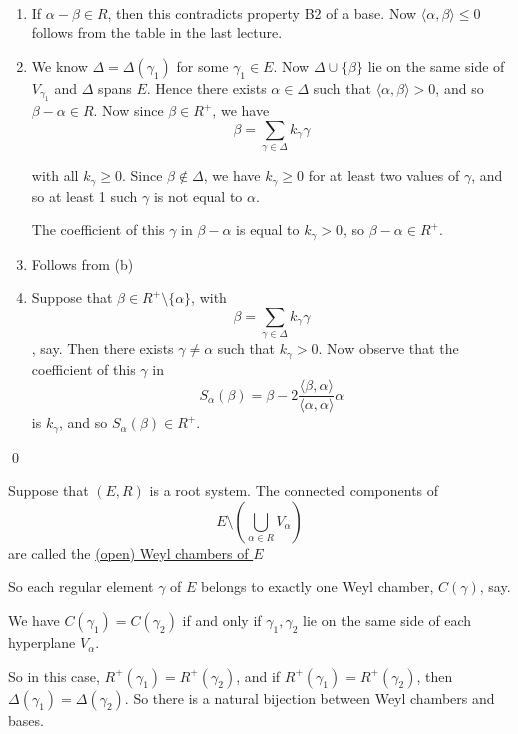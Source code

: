 \documentclass[x11names,reqno,14pt]{extarticle}
\begin{document}
\proof
\,
\begin{enumerate}

\item If $\alpha-\beta\in R$, then this contradicts property B2 of a base. Now $\langle\alpha,\beta\rangle\leq0$ follows from the table in the last lecture. 

\item We know $\Delta=\Delta(\gamma_1)$ for some $\gamma_1\in E$. Now $\Delta\cup\{\beta\}$ lie on the same side of $V_{\gamma_1}$ and $\Delta$ spans $E$. Hence there exists $\alpha\in\Delta$ such that $\langle\alpha,\beta\rangle>0$, and so $\beta-\alpha\in R$. Now since $\beta \in R^+$, we have
\[
\beta = \sum_{\gamma\in\Delta}k_\gamma\gamma
\]

with all $k_\gamma\geq0$. Since $\beta\not\in\Delta$, we have $k_\gamma\geq0$ for at least two values of $\gamma$, and so at least 1 such $\gamma$ is not equal to $\alpha$.

The coefficient of this $\gamma$ in $\beta-\alpha$ is equal to $k_\gamma>0$, so $\beta-\alpha\in R^+$. 

\item Follows from (b)

\item Suppose that $\beta\in R^+\setminus\{\alpha\}$, with 
\[
\beta = \sum_{\gamma\in\Delta}k_\gamma\gamma
\]
, say. Then there exists $\gamma\neq\alpha$ such that $k_\gamma>0$. 
Now observe that the coefficient of this $\gamma$ in 
\[
S_\alpha(\beta) = \beta - 2\frac{\langle\beta,\alpha\rangle}{\langle\alpha,\alpha\rangle}\alpha
\]
is $k_\gamma$, and so $S_\alpha(\beta)\in R^+$.

\end{enumerate}

\qed


Suppose that $(E,R)$ is a root system. The connected components of
\[
E\setminus \left(\bigcup_{\alpha\in R}V_\alpha\right)
\]
are called the \underline{(open) Weyl chambers of $E$}

So each regular element $\gamma$ of $E$ belongs to exactly one Weyl chamber, $C(\gamma)$, say. 

We have $C(\gamma_1) = C(\gamma_2)$ if and only if $\gamma_1,\gamma_2$ lie on the same side of each hyperplane $V_\alpha$. 

So in this case, $R^+(\gamma_1) = R^+(\gamma_2)$, and if $R^+(\gamma_1) = R^+(\gamma_2)$, then $\Delta(\gamma_1) = \Delta(\gamma_2)$. So there is a natural bijection between Weyl chambers and bases. 
\end{document}
